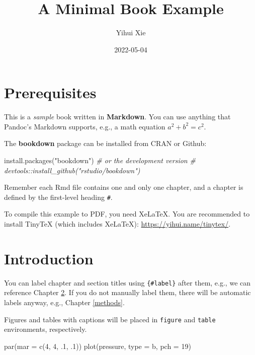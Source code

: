 \documentclass[
]{book}
\title{A Minimal Book Example}
\author{Yihui Xie}
\date{2022-05-04}
\newenvironment{Shaded}{\begin{snugshade}}{\end{snugshade}}
\newcommand{\AttributeTok}[1]{\textcolor[rgb]{0.77,0.63,0.00}{#1}}
\newcommand{\CommentTok}[1]{\textcolor[rgb]{0.56,0.35,0.01}{\textit{#1}}}
\newcommand{\DecValTok}[1]{\textcolor[rgb]{0.00,0.00,0.81}{#1}}
\newcommand{\FunctionTok}[1]{\textcolor[rgb]{0.00,0.00,0.00}{#1}}
\newcommand{\NormalTok}[1]{#1}
\newcommand{\StringTok}[1]{\textcolor[rgb]{0.31,0.60,0.02}{#1}}
\begin{document}
\maketitle

{
\setcounter{tocdepth}{1}
\tableofcontents
}
\hypertarget{prerequisites}{%
\chapter{Prerequisites}\label{prerequisites}}

This is a \emph{sample} book written in \textbf{Markdown}. You can use anything that Pandoc's Markdown supports, e.g., a math equation \(a^2 + b^2 = c^2\).

The \textbf{bookdown} package can be installed from CRAN or Github:

\begin{Shaded}
\begin{Highlighting}[]
\FunctionTok{install.packages}\NormalTok{(}\StringTok{"bookdown"}\NormalTok{)}
\CommentTok{\# or the development version}
\CommentTok{\# devtools::install\_github("rstudio/bookdown")}
\end{Highlighting}
\end{Shaded}

Remember each Rmd file contains one and only one chapter, and a chapter is defined by the first-level heading \texttt{\#}.

To compile this example to PDF, you need XeLaTeX. You are recommended to install TinyTeX (which includes XeLaTeX): \url{https://yihui.name/tinytex/}.

\hypertarget{intro}{%
\chapter{Introduction}\label{intro}}

You can label chapter and section titles using \texttt{\{\#label\}} after them, e.g., we can reference Chapter \ref{intro}. If you do not manually label them, there will be automatic labels anyway, e.g., Chapter \ref{methods}.

Figures and tables with captions will be placed in \texttt{figure} and \texttt{table} environments, respectively.

\begin{Shaded}
\begin{Highlighting}[]
\FunctionTok{par}\NormalTok{(}\AttributeTok{mar =} \FunctionTok{c}\NormalTok{(}\DecValTok{4}\NormalTok{, }\DecValTok{4}\NormalTok{, .}\DecValTok{1}\NormalTok{, .}\DecValTok{1}\NormalTok{))}
\FunctionTok{plot}\NormalTok{(pressure, }\AttributeTok{type =} \StringTok{\textquotesingle{}b\textquotesingle{}}\NormalTok{, }\AttributeTok{pch =} \DecValTok{19}\NormalTok{)}
\end{Highlighting}
\end{Shaded}
\end{document}
